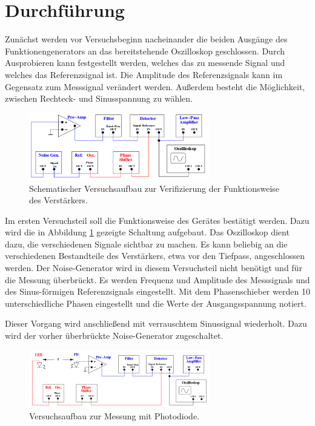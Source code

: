 \section{Durchführung}
\label{sec:Durchfuehrung}
Zunächst werden vor Versuchsbeginn nacheinander die beiden Ausgänge des Funktionengenerators an das bereitstehende Oszilloskop geschlossen. 
Durch Ausprobieren kann festgestellt werden, welches das zu messende Signal und welches das Referenzsignal ist.
Die Amplitude des Referenzsignals kann im Gegensatz zum Messsignal verändert werden. 
Außerdem besteht die Möglichkeit, zwischen Rechteck- und Sinusspannung zu wählen.
\begin{figure}
	\centering
	\includegraphics[width=0.7\textwidth]{Bilder/Messung1.pdf}	
	\caption{Schematischer Versuchsaufbau zur Verifizierung der Funktionsweise des Verstärkers. \cite{V303}}
	\label{fig:M1}	
\end{figure}

Im ersten Versuchsteil soll die Funktionsweise des Gerätes bestätigt werden. 
Dazu wird die in Abbildung \ref{fig:M1} gezeigte Schaltung aufgebaut. 
Das Oszilloskop dient dazu, die verschiedenen Signale sichtbar zu machen. 
Es kann beliebig an die verschiedenen Bestandteile des Verstärkers, etwa vor den Tiefpass, angeschlossen werden. 
Der Noise-Generator wird in diesem Versuchsteil nicht benötigt und für die Messung überbrückt. 
Es werden Frequenz und Amplitude des Messsignals und des Sinus-förmigen Referenzsignals eingestellt. 
Mit dem Phasenschieber werden 10 unterschiedliche Phasen eingestellt und die Werte der Ausgangsspannung notiert.

Dieser Vorgang wird anschließend mit verrauschtem Sinussignal wiederholt. 
Dazu wird der vorher überbrückte Noise-Generator zugeschaltet.

\begin{figure}
	\centering
		\includegraphics[width=0.7\textwidth]{Bilder/Messung2.pdf}
		\caption{Versuchsaufbau zur Messung mit Photodiode. \cite{V303}}
		\label{fig:M2}
	\end{figure}

